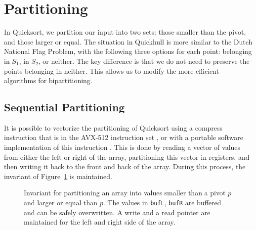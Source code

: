 \section{Partitioning}

In Quicksort, we partition our input into two sets: those smaller than the 
pivot, and those larger or equal. The situation in Quickhull is more similar
to the Dutch National Flag Problem, with the following three options for each
point: belonging in $S_1$, in $S_2$, or neither. The key difference is that
we do not need to preserve the points belonging in neither. This allows us
to modify the more efficient algorithms for bipartitioning.

\subsection{Sequential Partitioning}

It is possible to vectorize the partitioning of Quicksort using a compress
instruction that is in the AVX-512 instruction set \cite{Bramas17},
or with a portable software implementation of this instruction \cite{Blacher22}.
This is done by reading a vector of values from either the left or right of the
array, partitioning this vector in registers, and then writing it back to the
front and back of the array. During this process, the invariant of 
Figure~\ref{fig:invariant_bramas} is maintained.

\begin{figure}[ht]
    \caption{Invariant for partitioning an array into values smaller than
             a pivot $p$ and larger or equal than $p$. The values in
             \texttt{bufL}, \texttt{bufR} are buffered and can be safely
             overwritten. A write and a read pointer are maintained for
             the left and right side of the array.}
    \label{fig:invariant_bramas}
\end{figure}

